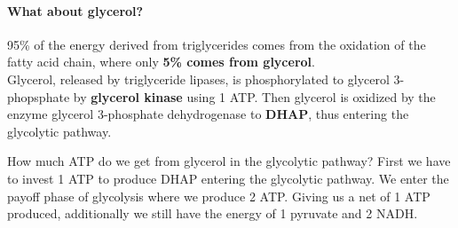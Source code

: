 \documentclass[../main.tex]{subfiles}
\begin{document}
\begin{figure}[H]
	\centering
	\hfil
	\caption{}
\end{figure}
 
\paragraph{What about glycerol?}
95\% of the energy derived from triglycerides comes from the oxidation of the fatty acid chain, where only \textbf{5\% comes from glycerol}.\\
\indent Glycerol, released by triglyceride lipases, is phosphorylated to glycerol 3-phopsphate by \textbf{glycerol kinase} using 1 ATP. Then glycerol is oxidized by the enzyme glycerol 3-phosphate dehydrogenase to \textbf{DHAP}, thus entering the glycolytic pathway. 

\begin{RemarkWithTitel}{How much ATP do we get from glycerol in the glycolytic pathway?}
	First we have to invest 1 ATP to produce DHAP entering the glycolytic pathway. We enter the payoff phase of glycolysis where we produce 2 ATP. Giving us a net of 1 ATP produced, additionally we still have the energy of 1 pyruvate and 2 NADH. 
\end{RemarkWithTitel}
\end{document}
